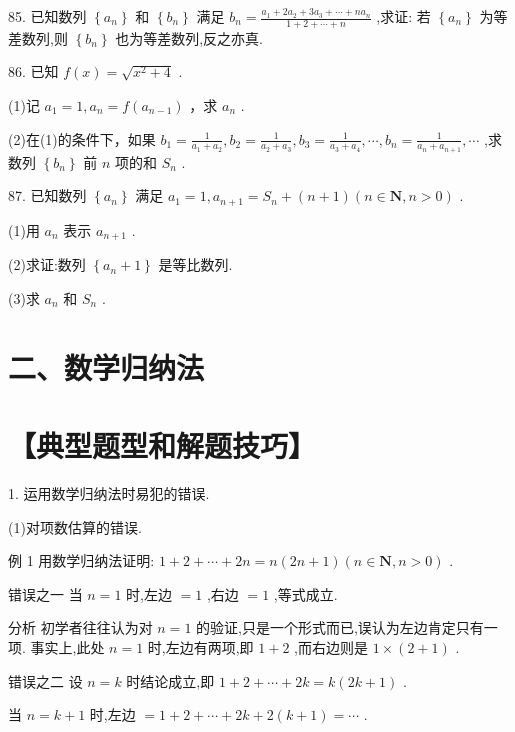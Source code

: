 \documentclass[10pt]{article}
\begin{document}
85. 已知数列 \(\left\{  {a}_{n}\right\}\) 和 \(\left\{  {b}_{n}\right\}\) 满足 \({b}_{n} = \frac{{a}_{1} + 2{a}_{2} + 3{a}_{3} + \cdots  + n{a}_{n}}{1 + 2 + \cdots  + n}\) ,求证: 若 \(\left\{  {a}_{n}\right\}\) 为等差数列,则 \(\left\{  {b}_{n}\right\}\) 也为等差数列,反之亦真.

86. 已知 \(f\left( x\right)  = \sqrt{{x}^{2} + 4}\) .

(1)记 \({a}_{1} = 1,{a}_{n} = f\left( {a}_{n - 1}\right)\) ，求 \({a}_{n}\) .

(2)在(1)的条件下，如果 \({b}_{1} = \frac{1}{{a}_{1} + {a}_{2}},{b}_{2} = \frac{1}{{a}_{2} + {a}_{3}},{b}_{3} = \frac{1}{{a}_{3} + {a}_{4}},\cdots ,{b}_{n} = \frac{1}{{a}_{n} + {a}_{n + 1}},\cdots\) ,求数列 \(\left\{  {b}_{n}\right\}\) 前 \(n\) 项的和 \({S}_{n}\) .

87. 已知数列 \(\left\{  {a}_{n}\right\}\) 满足 \({a}_{1} = 1,{a}_{n + 1} = {S}_{n} + \left( {n + 1}\right) \left( {n \in  \mathbf{N},n > 0}\right)\) .

(1)用 \({a}_{n}\) 表示 \({a}_{n + 1}\) .

(2)求证:数列 \(\left\{  {{a}_{n} + 1}\right\}\) 是等比数列.

(3)求 \({a}_{n}\) 和 \({S}_{n}\) .

\section*{二、数学归纳法}

\section*{【典型题型和解题技巧】}

1. 运用数学归纳法时易犯的错误.

(1)对项数估算的错误.

例 1 用数学归纳法证明: \(1 + 2 + \cdots  + {2n} = n\left( {{2n} + 1}\right) \left( {n \in  \mathbf{N},n > 0}\right)\) .

错误之一 当 \(n = 1\) 时,左边 \(= 1\) ,右边 \(= 1\) ,等式成立.

分析 初学者往往认为对 \(n = 1\) 的验证,只是一个形式而已,误认为左边肯定只有一项. 事实上,此处 \(n = 1\) 时,左边有两项,即 \(1 + 2\) ,而右边则是 \(1 \times  \left( {2 + 1}\right)\) .

错误之二 设 \(n = k\) 时结论成立,即 \(1 + 2 + \cdots  + {2k} = k\left( {{2k} + 1}\right)\) .

当 \(n = k + 1\) 时,左边 \(= 1 + 2 + \cdots  + {2k} + 2\left( {k + 1}\right)  = \cdots\) .
\end{document}
